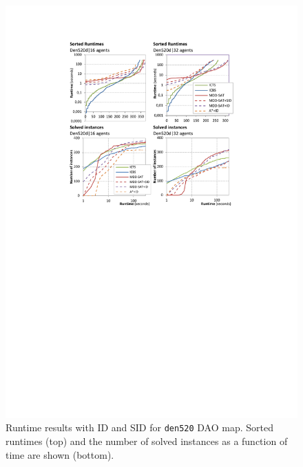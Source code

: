 \documentclass[jair,oneside,11pt]{article}
\begin{document}
\begin{figure}[h]
\centering
\includegraphics[trim={2.5cm 15.0cm 2.5cm 2.6cm},clip,width=1.0\textwidth]{expr-id_den520_sorted.pdf}
\vspace{-0.6cm}\caption{Runtime results with ID and SID for \texttt{den520} DAO map. Sorted runtimes (top) and the number of solved instances as a function of time are shown (bottom).}
\label{figure-den520-sorted-id}
\end{figure}
\end{document}
